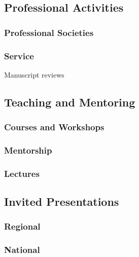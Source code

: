 \documentclass[
  16,
]{article}
\begin{document}
\subsection{Professional Activities}\label{professional-activities}

\subsubsection{Professional Societies}\label{professional-societies}

\subsubsection{Service}\label{service}

Manuscript reviews

\subsection{Teaching and Mentoring}\label{teaching-and-mentoring}

\subsubsection{Courses and Workshops}\label{courses-and-workshops}

\subsubsection{Mentorship}\label{mentorship}

\subsubsection{Lectures}\label{lectures}

\subsection{Invited Presentations}\label{invited-presentations}

\subsubsection{Regional}\label{regional}

\subsubsection{National}\label{national}
\end{document}
